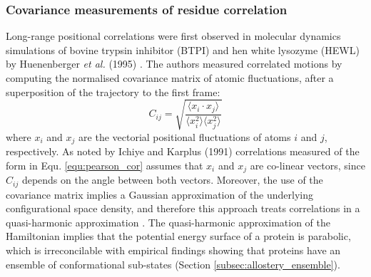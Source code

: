 \subsubsection{Covariance measurements of residue correlation}
Long-range positional correlations were first observed in molecular dynamics simulations of bovine trypsin inhibitor (BTPI) and hen white lysozyme (HEWL) by Huenenberger \textit{et al.} (1995) \cite{Hunenberger:1995aa}. The authors measured correlated motions by computing the normalised covariance matrix of atomic fluctuations, after a superposition of the trajectory to the first frame:
%
%
\begin{equation}
C_{ij} = \sqrt{\frac{\langle x_{i} \cdot x_{j} \rangle}{\langle x_{i}^{2} \rangle \langle x_{j}^{2} \rangle}}
\label{equ:pearson_cor}
\end{equation}
%
%
where $x_{i}$ and $x_{j}$ are the vectorial positional fluctuations of atoms $i$ and $j$, respectively. As noted by Ichiye and Karplus (1991) \cite{Ichiye:1991aa} correlations measured of the form in Equ. \ref{equ:pearson_cor} assumes that $x_{i}$ and $x_{j}$ are co-linear vectors, since $C_{ij}$ depends on the angle between both vectors. Moreover, the use of the covariance matrix implies a Gaussian approximation of the underlying configurational space density, and therefore this approach treats correlations in a quasi-harmonic approximation \cite{Lange:2006aa}. The quasi-harmonic approximation of the Hamiltonian implies that the potential energy surface of a protein is parabolic, which is irreconcilable with empirical findings showing that proteins have an ensemble of conformational sub-states (Section \ref{subsec:allostery_ensemble}). 


